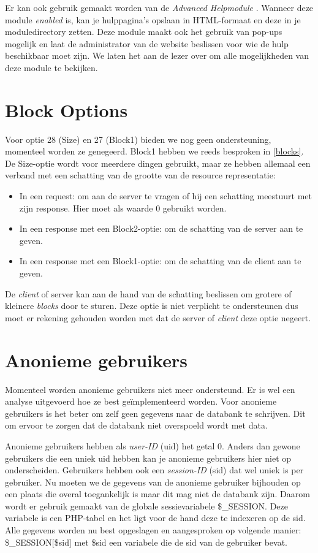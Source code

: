 Er kan ook gebruik gemaakt worden van de \textit{Advanced Helpmodule} \cite{advancedHelp}. Wanneer deze module \textit{enabled} is, kan je hulppagina's opslaan in HTML-formaat en deze in je moduledirectory zetten. Deze module maakt ook het gebruik van pop-ups mogelijk en laat de administrator van de website beslissen voor wie de hulp beschikbaar moet zijn. We laten het aan de lezer over om alle mogelijkheden van deze module te bekijken.
\section{Block Options} \label{unsupportedBlockOptions}
Voor optie 28 (Size) en 27 (Block1) bieden we nog geen ondersteuning, momenteel worden ze genegeerd. Block1 hebben we reeds besproken in \ref{blocks}. De Size-optie wordt voor meerdere dingen gebruikt, maar ze hebben allemaal een verband met een schatting van de grootte van de resource representatie:
\begin{itemize}
\item In een request: om aan de server te vragen of hij een schatting meestuurt met zijn response. Hier moet als waarde 0 gebruikt worden.
\item In een response met een Block2-optie: om de schatting van de server aan te geven.
\item In een response met een Block1-optie: om de schatting van de client aan te geven.
\end{itemize}
De \textit{client} of server kan aan de hand van de schatting beslissen om grotere of kleinere \textit{blocks} door te sturen. Deze optie is niet verplicht te ondersteunen dus moet er rekening gehouden worden met dat de server of \textit{client} deze optie negeert.

\section{Anonieme gebruikers}
Momenteel worden anonieme gebruikers niet meer ondersteund. Er is wel een analyse uitgevoerd hoe ze best ge\"{i}mplementeerd worden. Voor anonieme gebruikers is het beter om zelf geen gegevens naar de databank te schrijven. Dit om ervoor te zorgen dat de databank niet overspoeld wordt met data.

Anonieme gebruikers hebben als \textit{user-ID} (uid) het getal 0. Anders dan gewone gebruikers die een uniek uid hebben kan je anonieme gebruikers hier niet op onderscheiden. Gebruikers hebben ook een \textit{session-ID} (sid) dat wel uniek is per gebruiker. Nu moeten we de gegevens van de anonieme gebruiker bijhouden op een plaats die overal toegankelijk is maar dit mag niet de databank zijn. Daarom wordt er gebruik gemaakt van de globale sessievariabele \cite{sessionVariable} \$\_SESSION. Deze variabele is een PHP-tabel en het ligt voor de hand deze te indexeren op de sid. Alle gegevens worden nu best opgeslagen en aangesproken op volgende manier: \$\_SESSION[\$sid] met \$sid een variabele die de sid van de gebruiker bevat. 
